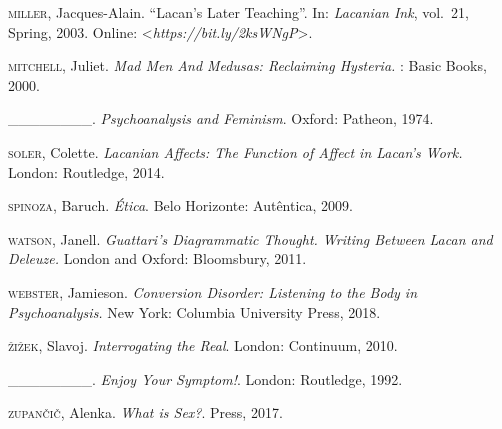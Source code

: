 \begin{Parskip}
\textsc{miller}, Jacques-Alain. ``Lacan's Later Teaching''. In: \emph{Lacanian Ink}, vol.~21,
Spring, 2003. Online:
\textless{}\emph{https://bit.ly/2ksWNgP}\textgreater{}.

\textsc{mitchell}, Juliet. \emph{Mad Men And Medusas: Reclaiming Hysteria.} :
Basic Books, 2000.

\_\_\_\_\_\_\_\_. \emph{Psychoanalysis and Feminism}. Oxford: Patheon, 1974.

\textsc{soler}, Colette. \emph{Lacanian Affects: The Function of Affect in
Lacan's Work.} London: Routledge, 2014.

\textsc{spinoza}, Baruch. \emph{Ética}. Belo Horizonte: Autêntica, 2009.

\textsc{watson}, Janell. \emph{Guattari's Diagrammatic Thought. Writing Between
Lacan and Deleuze.} London and Oxford: Bloomsbury, 2011.

\textsc{webster}, Jamieson. \emph{Conversion Disorder: Listening to the Body in
Psychoanalysis.} New York: Columbia University Press, 2018.

\textsc{žižek}, Slavoj. \emph{Interrogating the Real}. London: Continuum, 2010.

\_\_\_\_\_\_\_\_. \emph{Enjoy Your Symptom!}. London: Routledge, 1992.

\textsc{zupančič}, Alenka. \emph{What is Sex?}.  Press, 2017.
\end{Parskip}